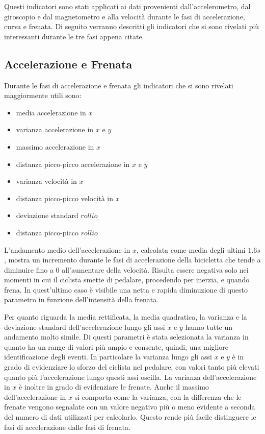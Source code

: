 \documentclass[12pt]{article}
\begin{document}
	
	Questi indicatori sono stati applicati ai dati provenienti dall'accelerometro, dal giroscopio e dal magnetometro e alla velocità durante le fasi di accelerazione, curva e frenata. Di seguito verranno descritti gli indicatori che si sono rivelati più interessanti durante le tre fasi appena citate.
	
	\subsection{Accelerazione e Frenata}
	Durante le fasi di accelerazione e frenata gli indicatori che si sono rivelati maggiormente utili sono:
	\begin{itemize}
		\item media accelerazione in \(x\)
		\item varianza accelerazione in \(x\) e \(y\)
		\item massimo accelerazione in \(x\)
		\item distanza picco-picco accelerazione in \(x\) e \(y\)
		\item varianza velocità in \(x\)
		\item distanza picco-picco velocità in \(x\)
		\item deviazione standard \(rollio\)
		\item distanza picco-picco \(rollio\)
	\end{itemize}
	
	L'andamento medio dell'accelerazione in \(x\), calcolata come media degli ultimi \(1.6s\), mostra un incremento durante le fasi di accelerazione della bicicletta che tende a diminuire fino a \(0\) all'aumentare della velocità.
	Risulta essere negativa solo nei momenti in cui il ciclista smette di pedalare, procedendo per inerzia, e quando frena. In quest'ultimo caso è visibile una netta e rapida diminuzione di questo parametro in funzione dell'intensità della frenata.
	
	Per quanto riguarda la media rettificata, la media quadratica, la varianza e la deviazione standard dell'accelerazione lungo gli assi \(x\) e \(y\) hanno tutte un andamento molto simile. Di questi parametri è stata selezionata la varianza in quanto ha un range di valori più ampio e consente, quindi, una migliore identificazione degli eventi. In particolare la varianza lungo gli assi \(x\) e \(y\) è in grado di evidenziare lo sforzo del ciclista nel pedalare, con valori tanto più elevati quanto più l'accelerazione lungo questi assi oscilla. La varianza dell'accelerazione in \(x\) è inoltre in grado di evidenziare le frenate.
	Anche il massimo dell'accelerazione in \(x\) si comporta come la varianza, con la differenza che le frenate vengono segnalate con un valore negativo più o meno evidente a seconda del numero di dati utilizzati per calcolarlo. Questo rende più facile distinguere le fasi di accelerazione dalle fasi di frenata.
	
\end{document}
